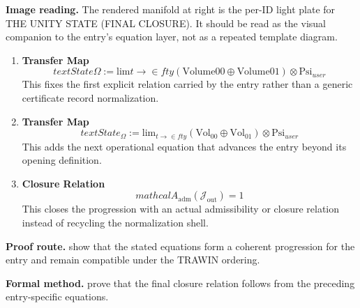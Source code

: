 \begin{samepage}
\noindent\begin{minipage}[t]{0.45\linewidth}
\vspace{0pt}
\raggedright
\scriptsize\textbf{Image reading.} The rendered manifold at right is the per-ID light plate for THE UNITY STATE (FINAL CLOSURE). It should be read as the visual companion to the entry's equation layer, not as a repeated template diagram.\par
\end{minipage}\hfill
\begin{minipage}[t]{0.53\linewidth}
\vspace*{-0.10in}
\raggedright
{}
\end{minipage}
\end{samepage}

\clearpage


\begin{enumerate}[leftmargin=1.6em,itemsep=9pt,topsep=6pt]
\item \textbf{Transfer Map}
\[
text{State} {\Omega} := \mathrm{lim} {t \to \in fty} (\text{Volume} {00} \oplus \text{Volume} {01}) \otimes \mathrm{Psi}_{user}
\]
This fixes the first explicit relation carried by the entry rather than a generic certificate record normalization.

\item \textbf{Transfer Map}
\[
text{State}_{\Omega} := \mathrm{lim}_{t \to \in fty} (\text{Vol}_{00} \oplus \text{Vol}_{01}) \otimes \mathrm{Psi}_{user}
\]
This adds the next operational equation that advances the entry beyond its opening definition.

\item \textbf{Closure Relation}
\[
mathcal{A}_{\mathrm{adm}}\!\left(\mathcal{J}_{\mathrm{out}}\right)=1
\]
This closes the progression with an actual admissibility or closure relation instead of recycling the normalization shell.
\end{enumerate}

\textbf{Proof route.} show that the stated equations form a coherent progression for the entry and remain compatible under the TRAWIN ordering.

\textbf{Formal method.} prove that the final closure relation follows from the preceding entry-specific equations.

